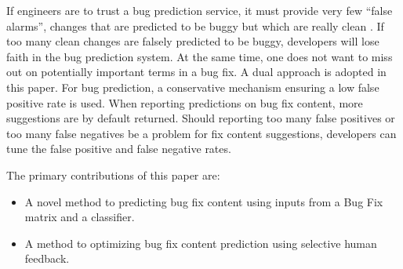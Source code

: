 \documentclass[10pt, conference, letterpaper, compsocconf]{IEEEtran}
\begin{document}
If engineers are to trust a bug prediction service, it must provide very few
``false alarms'', changes that are predicted to be buggy but which are really clean \cite{DBLP:journals/cacm/BesseyBCCFHHKME10}. If
too many clean changes are falsely predicted to be buggy, developers will lose
faith in the bug prediction system. At the same time, one does not want to miss out on potentially important terms in a bug fix. 
A dual approach is adopted in this paper. 
For bug prediction, a conservative mechanism ensuring a low false positive rate is used. 
When reporting predictions on bug fix content, more suggestions are by default
returned. Should reporting too many false positives or too many false negatives be a problem for fix content suggestions, developers can tune the false positive and false negative rates.


% 

The primary contributions of this paper are: 
\begin{itemize}
\item A novel method to predicting bug fix content using inputs from a Bug Fix matrix and a classifier. 
\item A method to optimizing bug fix content prediction using selective
human feedback.
\end{itemize}
\end{document}
